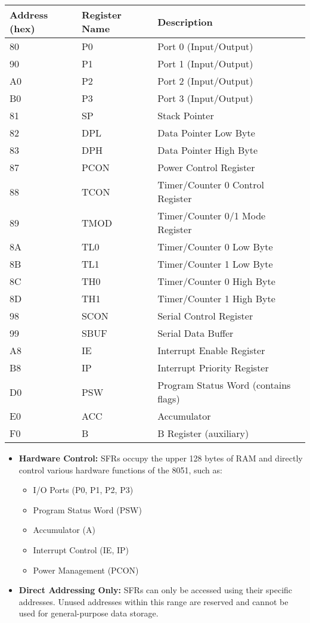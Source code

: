 \documentclass[
]{article}
\begin{document}
\begin{longtable}[]{@{}lll@{}}
\toprule
Address (hex) & Register Name & Description \\
\midrule
\endhead
80 & P0 & Port 0 (Input/Output) \\
90 & P1 & Port 1 (Input/Output) \\
A0 & P2 & Port 2 (Input/Output) \\
B0 & P3 & Port 3 (Input/Output) \\
81 & SP & Stack Pointer \\
82 & DPL & Data Pointer Low Byte \\
83 & DPH & Data Pointer High Byte \\
87 & PCON & Power Control Register \\
88 & TCON & Timer/Counter 0 Control Register \\
89 & TMOD & Timer/Counter 0/1 Mode Register \\
8A & TL0 & Timer/Counter 0 Low Byte \\
8B & TL1 & Timer/Counter 1 Low Byte \\
8C & TH0 & Timer/Counter 0 High Byte \\
8D & TH1 & Timer/Counter 1 High Byte \\
98 & SCON & Serial Control Register \\
99 & SBUF & Serial Data Buffer \\
A8 & IE & Interrupt Enable Register \\
B8 & IP & Interrupt Priority Register \\
D0 & PSW & Program Status Word (contains flags) \\
E0 & ACC & Accumulator \\
F0 & B & B Register (auxiliary) \\
\bottomrule
\end{longtable}

\begin{itemize}
\item
  \textbf{Hardware Control:} SFRs occupy the upper 128 bytes of RAM and
  directly control various hardware functions of the 8051, such as:

  \begin{itemize}
  \item
    I/O Ports (P0, P1, P2, P3)
  \item
    Program Status Word (PSW)
  \item
    Accumulator (A)
  \item
    Interrupt Control (IE, IP)
  \item
    Power Management (PCON)
  \end{itemize}
\item
  \textbf{Direct Addressing Only:} SFRs can only be accessed using their
  specific addresses. Unused addresses within this range are reserved
  and cannot be used for general-purpose data storage.
\end{itemize}
\end{document}
